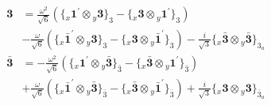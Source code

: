 \documentclass[english]{article}
\newcommand{\rep}[1]{\mathbf{#1}}
\newcommand{\repx}[2]{{}_{#2}\mathbf{#1}}
\newcommand{\tsprodx}[2]{\repx{#1}{x}\otimes\repx{#2}{y}}
\newcommand{\subcgt}[3]{\big\{ \tsprodx{#1}{#2}\big\}^{}_{#3}}
\begin{document}
\begin{itemize}
\begin{align*}
\\
\rep{3} & = \frac{\omega ^2}{\sqrt{6}}\left(\subcgt{1^{\prime}}{3}{3}-\subcgt{3}{1^{\prime}}{3}\right) \\ 
 & -\frac{\omega }{\sqrt{6}}\left(\subcgt{\bar{1}^{\prime}}{3}{3}-\subcgt{3}{\bar{1}^{\prime}}{3}\right)-\frac{i}{\sqrt{3}}\subcgt{\bar{3}}{\bar{3}}{3_{a}}
\\
\rep{\bar{3}} & = -\frac{\omega ^2}{\sqrt{6}}\left(\subcgt{1^{\prime}}{\bar{3}}{\bar{3}}-\subcgt{\bar{3}}{1^{\prime}}{\bar{3}}\right) \\ 
 & +\frac{\omega }{\sqrt{6}}\left(\subcgt{\bar{1}^{\prime}}{\bar{3}}{\bar{3}}-\subcgt{\bar{3}}{\bar{1}^{\prime}}{\bar{3}}\right)+\frac{i}{\sqrt{3}}\subcgt{3}{3}{\bar{3}_{a}}
\end{align*}
\end{itemize}
\end{document}
